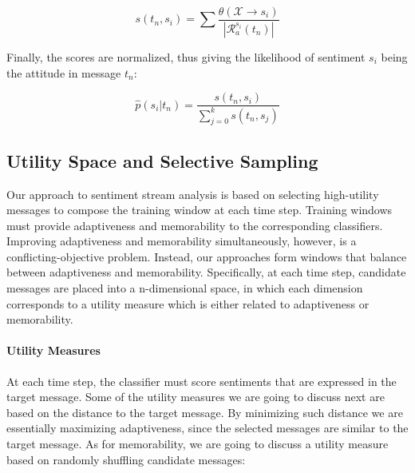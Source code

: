 \begin{equation} \label{eq1}
s(t_n, s_i)=\displaystyle\sum \displaystyle\frac{\theta(\mathcal{X}\xrightarrow{}s_i)}{|\mathcal{R}^{s_i}_a(t_n)|}
\end{equation}

Finally, the scores are normalized, thus giving the likelihood of sentiment $s_i$ being the attitude in message $t_n$:

\begin{equation}
\label{eq:prob}
\hat{p}(s_i|t_n)=\displaystyle\frac{s(t_n, s_i)}{\displaystyle\sum^{k}_{j=0} s(t_n, s_j)}
\end{equation}

\subsection{Utility Space and Selective Sampling}

Our approach to sentiment stream analysis is based on selecting high-utility messages to compose the training window at each time step. Training windows must provide adaptiveness and memorability to the corresponding classifiers. Improving adaptiveness and memorability simultaneously, however, is a conflicting-objective problem. Instead, our approaches form windows that balance between adaptiveness and memorability. Specifically, at each time step, candidate messages are placed into a n-dimensional space, in which each dimension corresponds to a utility measure which is either related to adaptiveness or memorability.

\paragraph*{\bf{Utility Measures}}
At each time step, the classifier must score sentiments that are expressed in the target message. Some of the utility measures we are going to discuss next are based on the distance to the target message. By minimizing such distance we are essentially maximizing adaptiveness, since the selected messages are similar to the target message. As for memorability, we are going to discuss a utility measure based on randomly shuffling candidate messages:


